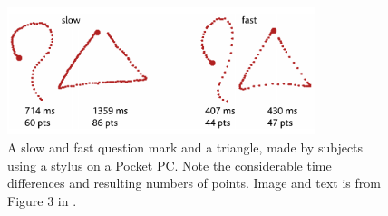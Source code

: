 \begin{figure}[!htb]
  \centering
  \includegraphics[width=0.8\textwidth]{images/1-dollar-gesturetrace.png}
  \caption{A slow and fast question mark and a triangle, made by subjects using a stylus on a Pocket PC. Note the considerable time differences and resulting numbers of points. Image and text is from Figure 3 in \protect\cite{wobbrock2007gestures}.}
  \label{fig:onedollar-gesturetrace}
\end{figure}


